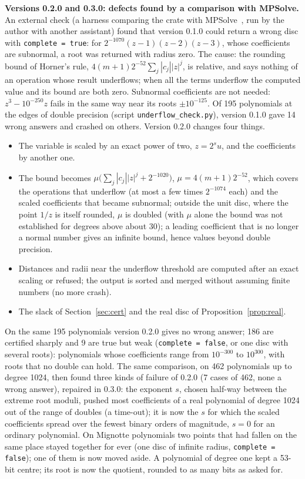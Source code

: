 \documentclass[10pt,a4paper]{article}
\theoremstyle{definition}
\numberwithin{equation}{section}
\begin{document}
\textbf{Versions 0.2.0 and 0.3.0: defects found by a comparison with MPSolve.} An external check (a
harness comparing the crate with MPSolve~\cite{mpsolve}, run by the author with another assistant)
found that version 0.1.0 could return a wrong disc with \texttt{complete = true}: for
$2^{-1070}(z-1)(z-2)(z-3)$, whose coefficients are subnormal, a root was returned with radius zero.
The cause: the rounding bound of Horner's rule, $4(m+1)2^{-52}\sum_j|c_j||z|^j$, is relative, and says
nothing of an operation whose result underflows; when all the terms underflow the computed value and its
bound are both zero. Subnormal coefficients are not needed: $z^3-10^{-250}z$ fails in the same way near
its roots $\pm10^{-125}$. Of 195 polynomials at the edges of double precision (script
\texttt{underflow\_check.py}), version 0.1.0 gave 14 wrong answers and crashed on others. Version 0.2.0
changes four things.
\begin{itemize}
\item The variable is scaled by an exact power of two, $z=2^su$, and the coefficients by another one.
\item The bound becomes $\mu\bigl(\sum_j|c_j||z|^j+2^{-1020}\bigr)$, $\mu=4(m+1)2^{-52}$, which covers
 the operations that underflow (at most a few times $2^{-1074}$ each) and the scaled coefficients that
 became subnormal; outside the unit disc, where the point $1/z$ is itself rounded, $\mu$ is doubled
 (with $\mu$ alone the bound was not established for degrees above about 30); a leading coefficient
 that is no longer a normal number gives an infinite bound, hence values beyond double precision.
\item Distances and radii near the underflow threshold are computed after an exact scaling or
 refused; the output is sorted and merged without assuming finite numbers (no more crash).
\item The slack of Section~\ref{sec:cert} and the real disc of Proposition~\ref{prop:real}.
\end{itemize}
On the same 195 polynomials version 0.2.0 gives no wrong answer; 186 are certified sharply and 9 are
true but weak (\texttt{complete = false}, or one disc with several roots): polynomials whose
coefficients range from $10^{-300}$ to $10^{300}$, with roots that no double can hold. The same
comparison, on 462 polynomials up to degree 1024, then found three kinds of failure of 0.2.0 (7 cases of 462, none a
wrong answer), repaired in 0.3.0: the exponent $s$, chosen half-way between the extreme root moduli,
pushed most coefficients of a real polynomial of degree 1024 out of the range of doubles (a time-out);
it is now the $s$ for which the scaled coefficients spread over the fewest binary orders of magnitude,
$s=0$ for an ordinary polynomial. On Mignotte polynomials two points that had fallen on the same place
stayed together for ever (one disc of infinite radius, \texttt{complete = false}); one of them is now
moved aside. A polynomial of degree one kept a 53-bit centre; its root is now the quotient, rounded to
as many bits as asked for.
\end{document}
